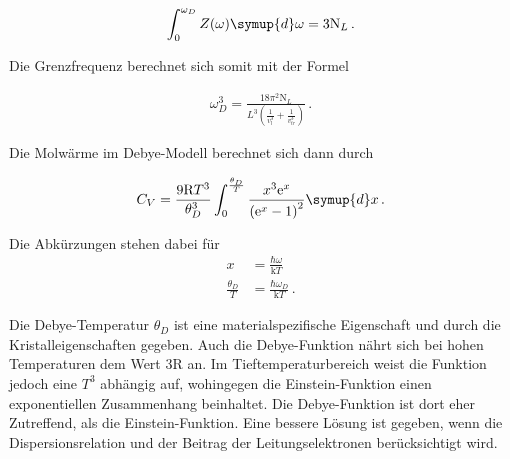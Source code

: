 \begin{align*}
  \int_0^{\omega_D} Z(\omega) \symup{d} \omega = 3 \text{N}_L \, .
\end{align*}

Die Grenzfrequenz berechnet sich somit mit der Formel

\begin{align*}
  \omega_D^3 = \frac{18 \pi^2 \text{N}_L}{L^3 \left(\frac{1}{v_l^3} + \frac{1}{v_{tr}^3} \right)} \, .
\end{align*}

Die Molwärme im Debye-Modell berechnet sich dann durch

\begin{equation}
  C_V = \frac{9 \text{R} T^3}{\theta_D^3} \int_0^{\frac{\theta_D}{T}}
  \frac{x^3 \mathrm{e}^x} {\left(\mathrm{e}^x -1 \right)^2} \symup{d} x \, .
\end{equation}

Die Abkürzungen stehen dabei für
\begin{align*}
  x &= \frac{\hbar \omega}{\text{k} T} \\
  \frac{\theta_D}{T} &= \frac{\hbar \omega_D}{\text{k} T} \, .
\end{align*}

Die Debye-Temperatur $\theta_D$ ist eine materialspezifische Eigenschaft und
durch die Kristalleigenschaften gegeben. Auch die Debye-Funktion nährt sich
bei hohen Temperaturen dem Wert $3 \text{R}$ an. Im Tieftemperaturbereich
weist die Funktion jedoch eine $T^3$ abhängig auf, wohingegen die
Einstein-Funktion einen exponentiellen Zusammenhang beinhaltet. Die
Debye-Funktion ist dort eher Zutreffend, als die Einstein-Funktion. Eine bessere
Lösung ist gegeben, wenn die Dispersionsrelation und der Beitrag der
Leitungselektronen berücksichtigt wird.
